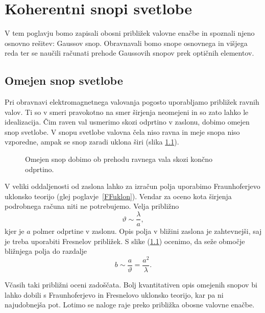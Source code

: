 
\chapter{Koherentni snopi svetlobe}
V tem poglavju bomo zapisali obosni približek valovne enačbe in spoznali 
njeno osnovno rešitev: Gaussov snop. Obravnavali bomo snope osnovnega in višjega reda ter
se naučili računati prehode Gaussovih snopov prek optičnih elementov. 

\section{Omejen snop svetlobe}
Pri obravnavi elektromagnetnega valovanja pogosto uporabljamo
približek ravnih valov. Ti so v smeri pravokotno na smer širjenja
neomejeni in so zato lahko le idealizacija. Čim raven val usmerimo skozi odprtino
v zaslonu, dobimo omejen snop svetlobe. V snopu svetlobe valovna čela niso
ravna in meje snopa niso vzporedne, ampak se snop zaradi uklona širi (slika \ref{fig:Uklon-na-rezi}).
\begin{figure}[h]
\centering
\def\svgwidth{120truemm} 

\caption{Omejen snop dobimo ob prehodu ravnega vala skozi končno odprtino.}
\label{fig:Uklon-na-rezi}
\end{figure}

V veliki oddaljenosti od zaslona lahko za izračun polja uporabimo
Fraunhoferjevo uklonsko teorijo (glej poglavje~\ref{FFuklon}). 
Vendar za oceno kota širjenja podrobnega računa niti ne potrebujemo. Velja približno 
\begin{equation}
\vartheta\sim\frac{\lambda}{a},
\label{eq:kot_ocena}
\end{equation}
kjer je $a$ polmer odprtine v zaslonu.
Opis polja v bližini zaslona je zahtevnejši, saj je treba uporabiti 
Fresnelov približek. S slike (\ref{fig:Uklon-na-rezi})
ocenimo, da seže območje bližnjega polja do razdalje 
\begin{equation}
b\sim\frac{a}{\vartheta}=\frac{a^{2}}{\lambda}.
\label{eq:z_ocena}
\end{equation}

Včasih taki približni oceni zadoščata. Bolj kvantitativen opis omejenih
snopov bi lahko dobili s Fraunhoferjevo in Fresnelovo uklonsko teorijo,
kar pa ni najudobnejša pot. Lotimo se naloge raje preko približka
obosne valovne enačbe.

